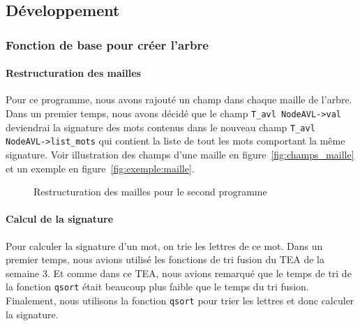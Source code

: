 \documentclass{article} %
\begin{document}
\subsection{Développement}

\subsubsection{Fonction de base pour créer l'arbre}
\paragraph{Restructuration des mailles} Pour ce programme, nous avons rajouté un champ dans chaque maille de l'arbre. Dans un premier temps, nous avons décidé que le champ \texttt{T\_avl NodeAVL->val} deviendrai la signature des mots contenus dans le nouveau champ \texttt{T\_avl NodeAVL->list\_mots} qui contient la liste de tout les mots comportant la même signature. Voir illustration des champs d'une maille en figure~\ref{fig:champs_maille} et un exemple en figure~\ref{fig:exemple:maille}.

\begin{figure}[H]
  \begin{center}
  \end{center}
  \caption{Restructuration des mailles pour le second programme}
  \label{fig:restruc_pro2}
\end{figure}

\paragraph{Calcul de la signature} Pour calculer la signature d'un mot, on trie les lettres de ce mot. Dans un premier temps, nous avions utilisé les fonctions de tri fusion du TEA de la semaine 3. Et comme dans ce TEA, nous avions remarqué que le temps de tri de la fonction \texttt{qsort} était beaucoup plus faible que le temps du tri fusion. Finalement, nous utilisons la fonction \texttt{qsort} pour trier les lettres et donc calculer la signature. 
\end{document}
